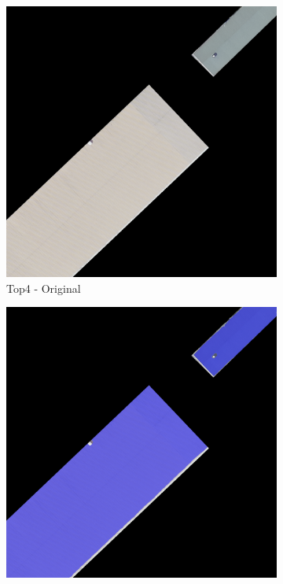 \begin{figure}[H]
\begin{subfigure}{0.32\textwidth}
    \includegraphics[width=\textwidth]{02-main//figures/ch4/kfold_ensembles/linknet_timm-efficientnet-b5/best_cases/best_2_iou0.986_24961121_tile_15_10_cc6553_original.png}
    \caption{Top4 - Original}
\end{subfigure}
\hfill
\begin{subfigure}{0.32\textwidth}
    \includegraphics[width=\textwidth]{02-main//figures/ch4/kfold_ensembles/linknet_timm-efficientnet-b5/best_cases/best_2_iou0.986_24961121_tile_15_10_cc6553_overlay_gt.png}

\end{subfigure}
\end{figure}
